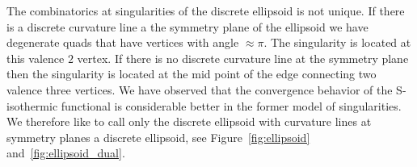 \documentclass[Thesis.tex]{subfiles}
\begin{document}
The combinatorics at singularities of the discrete ellipsoid is not unique. If there is a discrete 
curvature line a the symmetry plane of the ellipsoid we have degenerate quads that have 
vertices with angle $\approx\pi$. The singularity is located at this valence $2$ vertex. 
If there is no discrete curvature line at the symmetry plane then the singularity is located at the 
mid point of the edge connecting two valence three vertices. We have observed that 
the convergence behavior of the S-isothermic functional is considerable better in the former 
model of singularities. We therefore like to call only the discrete ellipsoid with curvature 
lines at symmetry planes a discrete ellipsoid, see Figure~\ref{fig:ellipsoid} and~\ref{fig:ellipsoid_dual}.

\subfilebibliography
\end{document}
